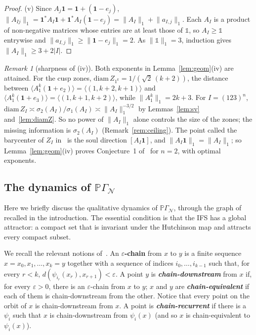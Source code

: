 \documentclass[11pt]{amsart}
\newcommand{\id}{\mathds{1}}
\theoremstyle{definition}
\theoremstyle{remark}
\newtheorem{remark}[proposition]{Remark}
\newcommand{\one}{\mathbf 1}
\newcommand{\PGN}{{\mathbb P}\Gamma_{\mathcal N}}
\newcommand{\abs}[1]{\lvert #1\rvert}
\newcommand{\norm}[1]{\lVert #1\rVert}
\newcommand{\pr}[1]{\langle #1\rangle}
\begin{document}
\begin{proof}
    (v) Since $A_j\one=\one+(\one-e_j)$, $\norm{A_{Ij}}_1=\one^*A_I\one+\one^*A_I(\one-e_j)=\norm{A_I}_1+\norm{a_{I,j}}_1$. Each $A_I$ is a product of non-negative matrices whose entries are at least those of $\id$, so $A_I\ge\id$ entrywise and $\norm{a_{I,j}}_1\ge\norm{\one-e_j}_1=2$. As $\norm{\id}_1=3$, induction gives $\norm{A_I}_1\ge3+2\abs I$.
\end{proof}

\begin{remark}[sharpness of (iv)]\label{rem:geomsharp}
Both exponents in Lemma~\ref{lem:geom}(iv) are attained. For the cusp zones, $\mathrm{diam}\,Z_{1^k}=1/(\sqrt2\,(k+2))$, the distance between $\pr{A_1^k(\one+e_2)}=\pr{(1,k+2,k+1)}$ and $\pr{A_1^k(\one+e_3)}=\pr{(1,k+1,k+2)}$, while $\|A_1^k\|_1=2k+3$. For $I=(123)^n$, $\mathrm{diam}\,Z_I\asymp\sigma_2(A_I)/\sigma_1(A_I)\asymp\|A_I\|_1^{-3/2}$ by Lemmas~\ref{lem:sv} and~\ref{lem:diamZ}. So no power of $\|A_I\|_1$ alone controls the size of the zones; the missing information is $\sigma_2(A_I)$ (Remark~\ref{rem:ceiling}). The point called the barycenter of $Z_I$ in~\cite{DL08} is the soul direction $[A_I\one]$, and $\|A_I\one\|_1=\|A_I\|_1$; so Lemma~\ref{lem:geom}(iv) proves Conjecture~1 of~\cite{DL08} for $n=2$, with optimal exponents.
\end{remark}

\subsection*{The dynamics of \texorpdfstring{$\PGN$}{the IFS}}
Here we briefly discuss the qualitative dynamics of $\PGN$, through the graph of~\cite{DLstreams} recalled in the introduction.
The essential condition is that the IFS has a global attractor: a compact set that is invariant under the Hutchinson map and attracts every compact subset.

We recall the relevant notions of~\cite{DLstreams}. 
An {\bf\boldmath$\varepsilon$-chain} from $x$ to $y$ is a finite sequence $x=x_0,x_1,\dots,x_k=y$ together with a sequence of indices $i_0,\dots,i_{k-1}$ such that, for every $r<k$, $d(\psi_{i_r}(x_r),x_{r+1})<\varepsilon$. 
A point $y$ is \emph{\bf\boldmath chain-downstream} from $x$ if, for every $\varepsilon>0$, there is an $\varepsilon$-chain from $x$ to $y$;  $x$ and $y$ are \emph{\bf\boldmath chain-equivalent} if each of them is chain-downstream from the other. 
Notice that every point on the orbit of $x$ is chain-downstream from $x$.
A point is \emph{\bf\boldmath chain-recurrent} if there is a $\psi_i$ such that $x$ is chain-downstream from $\psi_i(x)$ (and so $x$ is chain-equivalent to $\psi_i(x)$).
\end{document}
